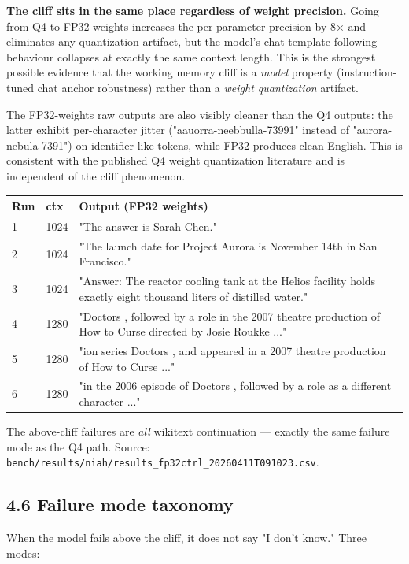 \documentclass[11pt]{article}
\begin{document}
\textbf{The cliff sits in the same place regardless of weight precision.} Going from Q4 to FP32 weights increases the per-parameter precision by 8× and eliminates any quantization artifact, but the model's chat-template-following behaviour collapses at exactly the same context length. This is the strongest possible evidence that the working memory cliff is a \textit{model} property (instruction-tuned chat anchor robustness) rather than a \textit{weight quantization} artifact.


The FP32-weights raw outputs are also visibly cleaner than the Q4 outputs: the latter exhibit per-character jitter ("aauorra-neebbulla-73991" instead of "aurora-nebula-7391") on identifier-like tokens, while FP32 produces clean English. This is consistent with the published Q4 weight quantization literature and is independent of the cliff phenomenon.


\begin{center}
\begin{tabular}{lll}
\toprule
Run & ctx & Output (FP32 weights) \\
\midrule
1 & 1024 & "The answer is Sarah Chen." \\
2 & 1024 & "The launch date for Project Aurora is November 14th in San Francisco." \\
3 & 1024 & "Answer: The reactor cooling tank at the Helios facility holds exactly eight thousand liters of distilled water." \\
4 & 1280 & "Doctors , followed by a role in the 2007 theatre production of How to Curse directed by Josie Roukke ..." \\
5 & 1280 & "ion series Doctors , and appeared in a 2007 theatre production of How to Curse ..." \\
6 & 1280 & "in the 2006 episode of Doctors , followed by a role as a different character ..." \\
\bottomrule
\end{tabular}
\end{center}


The above-cliff failures are \textit{all} wikitext continuation — exactly the same failure mode as the Q4 path. Source: \texttt{bench/results/niah/results\_fp32ctrl\_20260411T091023.csv}.


\subsection*{4.6 Failure mode taxonomy}


When the model fails above the cliff, it does not say "I don't know." Three modes:
\end{document}
